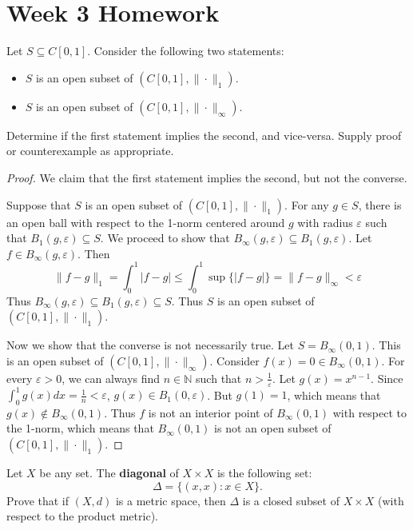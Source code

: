 \documentclass{article}
\theoremstyle{plain} %
\numberwithin{thm}{section} %
\theoremstyle{definition}
\begin{document}
\section{Week 3 Homework}
    \exercise Let $S\subseteq C[0,1]$. Consider the following two statements:
    \begin{itemize}
        \item $S$ is an open subset of $(C[0,1],\|\cdot\|_1)$.
        \item $S$ is an open subset of $(C[0,1],\|\cdot\|_\infty)$.
    \end{itemize}
    Determine if the first statement implies the second, and vice-versa. Supply proof or counterexample as appropriate.

    \begin{proof}
        We claim that the first statement implies the second, but not the converse.

        Suppose that \(S\) is an open subset of \((C[0,1], \|\cdot\|_1)\). For any \(g \in S\), there is an open ball with respect to the 1-norm centered around \(g\) with radius \(\varepsilon\) such that \(B_1 (g, \varepsilon)\subseteq S\). We proceed to show that \(B_\infty (g, \varepsilon) \subseteq B_1 (g, \varepsilon)\). Let \(f \in B_\infty (g, \varepsilon)\). Then
        \[
            \|f-g\| _1 = \int _0^1 \left\vert f-g \right\vert \leq \int _0^1 \sup \{ \left\vert f-g \right\vert \} = \|f-g\| _\infty < \varepsilon 
        \]
        Thus \(B_\infty (g, \varepsilon) \subseteq B_1 (g, \varepsilon) \subseteq S\). Thus \(S\) is an open subset of \((C[0,1], \|\cdot \| _1)\).

        Now we show that the converse is not necessarily true. Let \(S = B_\infty (0, 1)\). This is an open subset of \((C[0,1],\|\cdot\|_\infty)\). Consider \(f(x) = 0 \in B_\infty (0, 1)\). For every \(\varepsilon > 0\), we can always find \(n \in \mathbb{N}\) such that \(n > \frac{1}{\varepsilon}\). Let \(g(x) = x^{n-1}\). Since \(\int _0^1 g(x)dx = \frac{1}{n} < \varepsilon\), \(g(x) \in B_1(0, \varepsilon)\). But \(g(1) = 1\), which means that \(g(x) \notin B_\infty (0, 1)\). Thus \(f\) is not an interior point of \(B_\infty (0, 1)\) with respect to the 1-norm, which means that \(B_\infty (0, 1)\) is not an open subset of \((C[0,1],\|\cdot\|_1)\).
        
    \end{proof}
        \exercise Let $X$ be any set. The \textbf{diagonal} of $X\times X$ is the following set:
        \[ \Delta = \{(x,x) : x \in X\}. \]
        Prove that if $(X,d)$ is a metric space, then $\Delta$ is a closed subset of $X\times X$ (with respect to the product metric).
\end{document}
